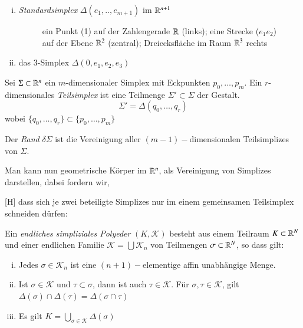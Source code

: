 \documentclass[a4paper,10pt]{scrartcl}
\begin{document}
\begin{exs*}
 \begin{enumerate}[(i)]
  \item \emph{Standardsimplex} $\Delta(e_1,.., e_{m+1})$ im $\mathbb{R}^{n+1}$
 \begin{figure}[H]
 \centering
\fixme[fig119]
\caption{ein Punkt (1) auf der Zahlengerade $\mathbb{R}$ (links); eine Strecke ($e_1e_2$) auf der Ebene $\mathbb{R}^2$ (zentral); Dreiecksfläche im Raum $\mathbb{R}^3$ rechts}
\end{figure} 
\item das $3$-Simplex $\Delta(0, e_1, e_2, e_3)$
 \begin{figure}[H]
 \centering
\fixme[fig120]
\caption{}
\end{figure}
 \end{enumerate}
\end{exs*}
\begin{df}
 Sei $\Sigma\subset \mathbb{R}^n$ ein $m$-dimensionaler Simplex mit Eckpunkten $p_0, \dotsc  , p_m$. 
Ein $r$-dimensionales \emph{Teilsimplex} ist eine Teilmenge $\Sigma'\subset \Sigma$ der Gestalt.
\[
 \Sigma'=\Delta(q_0,\dotsc  , q_r)
\]
wobei $\{q_0,\dotsc  , q_r\}\subset\{p_0,\dotsc  , p_m\}$

Der \emph{Rand} $\delta \Sigma$ ist die Vereinigung aller $(m-1)-$dimensionalen Teilsimplizes von $\Sigma$.
 \begin{figure}[H]
 \centering
\fixme[fig121]
\caption{}
\end{figure}
Man kann nun geometrische Körper im $\mathbb{R}^n$, als Vereinigung von Simplizes darstellen, dabei fordern wir, 
 \begin{figure}[H]
 \centering
\fixme[fig122]
\caption{}
\end{figure}[H]
dass sich je zwei beteiligte Simplizes nur im einem gemeinsamen Teilsimplex schneiden dürfen:
 \begin{figure}[H]
 \centering
\fixme[fig123]
\caption{}
\end{figure}
\end{df}
\begin{df}
 Ein \emph{endliches simpliziales Polyeder} $(K, \mathcal{K})$ besteht aus einem Teilraum $K\subset \mathbb{R}^N$ und einer endlichen Familie $\mathcal K=\bigcup \mathcal K_n$ von Teilmengen $\sigma\subset \mathbb{R}^N$, so dass gilt:
\begin{enumerate}[(i)]
 \item Jedes $\sigma\in \mathcal K_n$ ist eine $(n+1)-$elementige affin unabhängige Menge.
 \item Ist $\sigma \in \mathcal K$ und $\tau \subset \sigma$, dann ist auch $\tau \in \mathcal K$. Für $\sigma, \tau \in \mathcal K$, gilt $\Delta(\sigma)\cap \Delta(\tau)=\Delta(\sigma\cap\tau)$
 \item Es gilt $K=\bigcup_{\sigma\in \mathcal K}  \Delta(\sigma)$ 
\end{enumerate}

\end{df}
\end{document}
